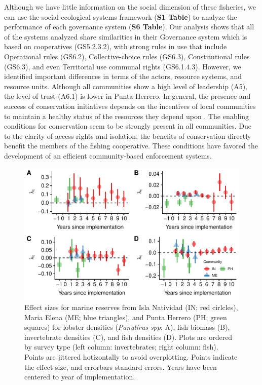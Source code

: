 \documentclass{frontiersSCNS}
\begin{document}
Although we have little information on the social dimension of these
fisheries, we can use the social-ecological systems framework
(\textbf{S1 Table}) to analyze the performance of each governance system
(\textbf{S6 Table}). Our analysis shows that all of the systems analyzed
share similarities in their Governance system which is based on
cooperatives (GS5.2.3.2), with strong rules in use that include
Operational rules (GS6.2), Collective-choice rules (GS6.3),
Constitutional rules (GS6.3), and even Territorial use communal rights
(GS6.1.4.3). However, we identified important differences in terms of
the actors, resource systems, and resource units. Although all
communities show a high level of leadership (A5), the level of trust
(A6.1) is lower in Punta Herrero. In general, the presence and success
of conservation initiatives depends on the incentives of local
communities to maintain a healthy status of the resources they depend
upon \citep{jupiter_2017}. The enabling conditions for conservation seem
to be strongly present in all communities. Due to the clarity of access
rights and isolation, the benefits of conservation directly benefit the
members of the fishing cooperative. These conditions have favored the
development of an efficient community-based enforcement systems.

\clearpage

\begin{figure}
\centering
\includegraphics{Villasenor-Derbez_files/figure-latex/unnamed-chunk-4-1.pdf}
\caption{\label{fig:unnamed-chunk-4}\label{fig:indicators}Effect sizes for
marine reserves from Isla Natividad (IN; red cirlcles), Maria Elena (ME;
blue triangles), and Punta Herrero (PH; green squares) for lobster
densities (\emph{Panulirus spp}; A), fish biomass (B), invertebrate
densities (C), and fish densities (D). Plots are ordered by survey type
(left column: invertebrates; right column: fish). Points are jittered
hotizontally to avoid overplotting. Points indicate the effect size, and
errorbars standard errors. Years have been centered to year of
implementation.}
\end{figure}
\end{document}

